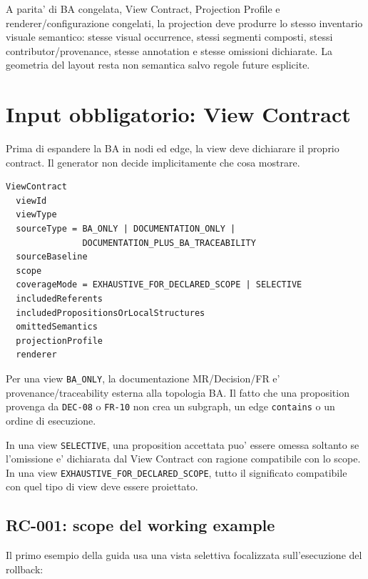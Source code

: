 \documentclass[11pt,a4paper]{article}
\begin{document}
\begin{ddtacore}[title={Determinismo semantico della projection}]
A parita' di BA congelata, View Contract, Projection Profile e renderer/configurazione congelati, la projection deve produrre lo stesso inventario visuale semantico: stesse visual occurrence, stessi segmenti composti, stessi contributor/provenance, stesse annotation e stesse omissioni dichiarate. La geometria del layout resta non semantica salvo regole future esplicite.
\end{ddtacore}

\clearpage
\section{Input obbligatorio: View Contract}

Prima di espandere la BA in nodi ed edge, la view deve dichiarare il proprio contract. Il generator non decide implicitamente che cosa mostrare.

\begin{lstlisting}
ViewContract
  viewId
  viewType
  sourceType = BA_ONLY | DOCUMENTATION_ONLY |
               DOCUMENTATION_PLUS_BA_TRACEABILITY
  sourceBaseline
  scope
  coverageMode = EXHAUSTIVE_FOR_DECLARED_SCOPE | SELECTIVE
  includedReferents
  includedPropositionsOrLocalStructures
  omittedSemantics
  projectionProfile
  renderer
\end{lstlisting}

Per una view \texttt{BA\_ONLY}, la documentazione MR/Decision/FR e' provenance/traceability esterna alla topologia BA. Il fatto che una proposition provenga da \texttt{DEC-08} o \texttt{FR-10} non crea un subgraph, un edge \texttt{contains} o un ordine di esecuzione.

\begin{ddtaanti}[title={Omissione non dichiarata vietata}]
In una view \texttt{SELECTIVE}, una proposition accettata puo' essere omessa soltanto se l'omissione e' dichiarata dal View Contract con ragione compatibile con lo scope. In una view \texttt{EXHAUSTIVE\_FOR\_DECLARED\_SCOPE}, tutto il significato compatibile con quel tipo di view deve essere proiettato.
\end{ddtaanti}

\subsection{RC-001: scope del working example}

Il primo esempio della guida usa una vista selettiva focalizzata sull'esecuzione del rollback:
\end{document}
